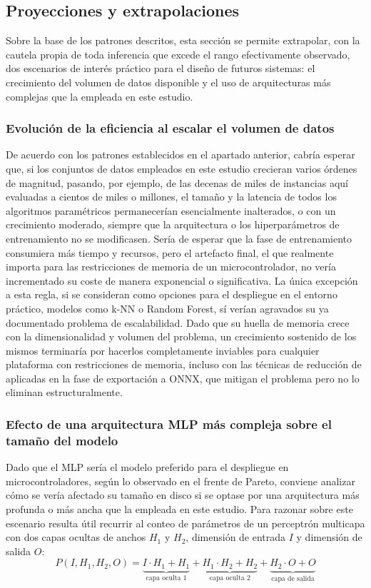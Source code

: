 \documentclass[a4paper,12pt,twoside,final]{book}
\begin{document}
\subsection{Proyecciones y extrapolaciones}
Sobre la base de los patrones descritos, esta sección se permite extrapolar, con la cautela propia de toda inferencia
que excede el rango efectivamente observado, dos escenarios de interés práctico para el diseño de futuros sistemas: el
crecimiento del volumen de datos disponible y el uso de arquitecturas más complejas que la empleada en este estudio.
 
\subsubsection{Evolución de la eficiencia al escalar el volumen de datos}
De acuerdo con los patrones establecidos en el apartado anterior, cabría esperar que, si los conjuntos de datos
empleados en este estudio crecieran varios órdenes de magnitud, pasando, por ejemplo, de las decenas de miles de
instancias aquí evaluadas a cientos de miles o millones, el tamaño y la latencia de todos los algoritmos paramétricos
permanecerían esencialmente inalterados, o con un crecimiento moderado, siempre que la arquitectura o los
hiperparámetros de entrenamiento no se modificasen. Sería de esperar que la fase de entrenamiento consumiera más tiempo y
recursos, pero el artefacto final, el que realmente importa para las restricciones de memoria de un microcontrolador, no
vería incrementado su coste de manera exponencial o significativa. La única excepción a esta regla, si se consideran
como opciones para el despliegue en el entorno práctico, modelos como k-NN o Random Forest, sí verían agravados su ya
documentado problema de escalabilidad. Dado que su huella de memoria crece con la dimensionalidad y volumen del problema,
un crecimiento sostenido de los mismos terminaría por hacerlos completamente inviables para cualquier plataforma con
restricciones de memoria, incluso con las técnicas de reducción de aplicadas en la fase de exportación a ONNX, que
mitigan el problema pero no lo eliminan estructuralmente.
 
\subsubsection{Efecto de una arquitectura MLP más compleja sobre el tamaño del modelo}
Dado que el MLP sería el modelo preferido para el despliegue en microcontroladores, según lo observado en el frente de
Pareto, conviene analizar cómo se vería afectado su tamaño en disco si se optase por una arquitectura más profunda o más
ancha que la empleada en este estudio. Para razonar sobre este escenario resulta útil recurrir al conteo de parámetros
de un perceptrón multicapa con dos capas ocultas de anchos $H_1$ y $H_2$, dimensión de entrada $I$ y dimensión de salida
$O$:
\[
P(I, H_1, H_2, O) = \underbrace{I \cdot H_1 + H_1}_{\text{capa oculta 1}} + 
\underbrace{H_1 \cdot H_2 + H_2}_{\text{capa oculta 2}} + \underbrace{H_2 \cdot O + O}_{\text{capa de salida}}
\]
\end{document}
